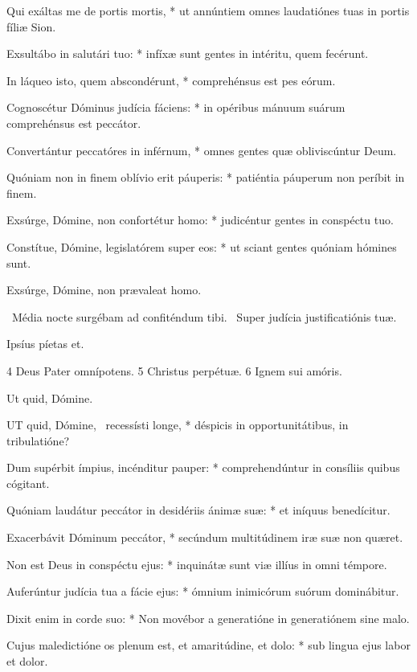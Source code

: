 Qui exáltas me de portis mortis, * ut annúntiem omnes laudatiónes tuas in portis fíliæ Sion.

Exsultábo in salutári tuo: * infíxæ sunt gentes in intéritu, quem fecérunt.

In láqueo isto, quem abscondérunt, * comprehénsus est pes eórum.

Cognoscétur Dóminus judícia fáciens: * in opéribus mánuum suárum comprehénsus est peccátor.

Convertántur peccatóres in inférnum, * omnes gentes quæ obliviscúntur Deum.

Quóniam non in finem oblívio erit páuperis: * patiéntia páuperum non períbit in finem.

Exsúrge, Dómine, non confortétur homo: * judicéntur gentes in conspéctu tuo.

Constítue, Dómine, legislatórem super eos: * ut sciant gentes quóniam hómines sunt.

 Exsúrge, Dómine, non prævaleat homo.

\V\ Média nocte surgébam ad confiténdum tibi. \R\ Super judícia justificatiónis tuæ.

 Ipsíus píetas et.

 4 Deus Pater omnípotens. 5 Christus perpétuæ. 6 Ignem sui amóris.


 Ut quid, Dómine. \textdagger


\lettrine[lines=2]{U}{T} quid, Dómine, \textdagger\ recessísti longe, * déspicis in opportunitátibus, in tribulatióne?

Dum supérbit ímpius, incénditur pauper: * comprehendúntur in consíliis quibus cógitant.

Quóniam laudátur peccátor in desidériis ánimæ suæ: * et iníquus benedícitur.

Exacerbávit Dóminum peccátor, * secúndum multitúdinem iræ suæ non quæret.

Non est Deus in conspéctu ejus: * inquinátæ sunt viæ illíus in omni témpore.

Auferúntur judícia tua a fácie ejus: * ómnium inimicórum suórum dominábitur.

Dixit enim in corde suo: * Non movébor a generatióne in generatiónem sine malo.

Cujus maledictióne os plenum est, et amaritúdine, et dolo: * sub lingua ejus labor et dolor.

